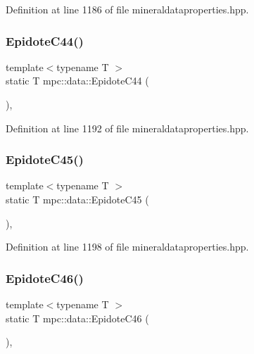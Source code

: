 Definition at line 1186 of file mineraldataproperties.\+hpp.

\mbox{\label{namespacempc_1_1data_ae61ce2da81a5ece42488a95c78babd09}} 
\subsubsection{\texorpdfstring{Epidote\+C44()}{EpidoteC44()}}
{\footnotesize\ttfamily template$<$typename T $>$ \\
static T mpc\+::data\+::\+Epidote\+C44 (\begin{DoxyParamCaption}{ }\end{DoxyParamCaption})\hspace{0.3cm}{\ttfamily [inline]}, {\ttfamily [static]}}



Definition at line 1192 of file mineraldataproperties.\+hpp.

\mbox{\label{namespacempc_1_1data_a60974a3577b9d3e19d09ae8d7b823a50}} 
\subsubsection{\texorpdfstring{Epidote\+C45()}{EpidoteC45()}}
{\footnotesize\ttfamily template$<$typename T $>$ \\
static T mpc\+::data\+::\+Epidote\+C45 (\begin{DoxyParamCaption}{ }\end{DoxyParamCaption})\hspace{0.3cm}{\ttfamily [inline]}, {\ttfamily [static]}}



Definition at line 1198 of file mineraldataproperties.\+hpp.

\mbox{\label{namespacempc_1_1data_ad4290f8a184974775fc7edb5afcc36f2}} 
\subsubsection{\texorpdfstring{Epidote\+C46()}{EpidoteC46()}}
{\footnotesize\ttfamily template$<$typename T $>$ \\
static T mpc\+::data\+::\+Epidote\+C46 (\begin{DoxyParamCaption}{ }\end{DoxyParamCaption})\hspace{0.3cm}{\ttfamily [inline]}, {\ttfamily [static]}}



